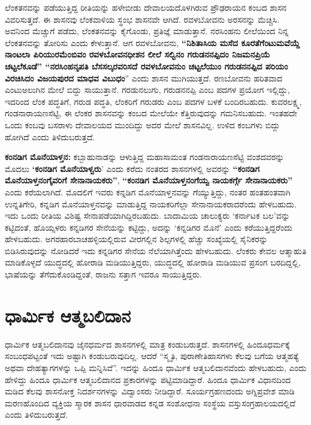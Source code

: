 ಲೆಂಕತನವನ್ನು ಪಡೆಯುತ್ತಿದ್ದ ರೀತಿಯನ್ನು ಹಳೇಬೀಡು ದೇವಾಲಯದೊಳಗಿರುವ ಪ್ರೌಢರಾಯನ ಕಂಬದ ಶಾಸನ ವಿವರಿಸುತ್ತದೆ. ಈ ಶಾಸನವು ಲೆಂಕವಾಳಿಯ ಸ್ಥಂಭ ಶಾಸನವೇ ಆಗಿದೆ. ರವಳಬೋವನು ಅರಸನನ್ನು ಮೆಚ್ಚಿಸಿ. ಅವನಿಂದ ಮೆಚ್ಚುಗೆ ಪಡೆದು, ಲೆಂಕತನವನ್ನು ಕೈಗೊಂಡು, ಪ್ರತಿಜ್ಞೆ ಮಾಡುತ್ತಾನೆ. ನರಸಿಂಹನು ಲೀಲೆಯಿಂದ ನಿನ್ನ ಲೆಂಕತನವನ್ನು ತೋರಿಸು ಎಂದು ಕೇಳುತ್ತಾನೆ. ಆಗ ರವಳಬೋವನು, \textbf{“ನಿಶಿತಾಸಿಯ ಮಸೆದ ಕೂರತೆಗೆಂಟುಮವೆಯ್ದೆ ನಾಂಟಲಾ ಪಿರಿಯುರಮೆಂಬಿವಂ ರವಳಬೋವನಧೀಶನ ಲೀಲೆ ಸಲ್ವಿನಂ ಗರುಡನನಪ್ಪಿದಂ ನಿಜಮನಪ್ರಿಯೆ ಚಟ್ಟಲೆಕೂಡೆ” “ನರಸಿಂಹನೃಪತಿ ಬೆಸಸಲ್ಕರವರಿಸದೆ ರವಳಬೋವನುಂ ಚಟ್ಟಲೆಯುಂ ಗರುಡನನಪ್ಪಿದ ಪರಿಯಂ ವಿರಚಿಸಿದಂ ವಿಜಯಪುರದ ಮಾಧವ ವಿಬುಧಂ}” ಎಂದು ಶಾಸನ ಮುಗಿಯುತ್ತದೆ. ರಣಬೋವನು ಹರಿತವಾದ ಎಂಟುಅಲುಗಿನ ಮೇಲೆ ಬಿದ್ದು ಸಾಯುತ್ತಾನೆ. ಗರಡುನಲುಗು, ಗರುಡನನಪ್ಪಿ ಎಂಬ ಪದಗಳ ಪ್ರಯೋಗ ಇಲ್ಲಿದ್ದು, ಇದರಿಂದ ಲೆಂಕ ಪದ್ಧತಿಗೆ, ಗರುಡ ಪದ್ಧತಿ, ಲೆಂಕರಿಗೆ ಗರುಡರು ಎಂಬ ಪದಗಳ ಬಳಕೆ ಬಂದಿರಬಹುದು. ಕುವರಲಕ್ಷ್ಮ, ಗಂಡನಾರಾಯಣಸೆಟ್ಟಿ, ಈ ಲೆಂಕರ ಶಾಸನವನ್ನು ಕಂಬದ ಮೇಲೆಯೇ ಕೆತ್ತಿರುವುದನ್ನು ಗಮನಿಸಬಹುದು. ಇಂತಹದೇ ಒಂದು ಕಂಬವು ಬಸರಾಳು ದೇವಾಲಯದ ಮುಂದಿದ್ದು ಅದರ ಮೇಲೆ ಶಾಸನವಿಲ್ಲ. ಉಳಿದ ಕಂಬಗಳು ಬಿದ್ದು ಹೋಗಿದೆ ಎಂದು ತಿಳಿದುಬರುತ್ತದೆ.

\textbf{ಕಂನಡಿಗ ಮೊನೆಯಾಳ್ತನ: }ಕಬ್ಬಾಹುನಾಡನ್ನು ಆಳುತ್ತಿದ್ದ ಮಹಾಸಾಮಂತ ಗಂಡನಾರಾಯಣಸೆಟ್ಟಿ ವಂಶದವರನ್ನು ಮೊದಲು \textbf{‘ಕಂನಡಿಗ ಮೊನೆಯಾಳ್ವರು}’ ಎಂದು ಕರೆದು ನಂತರದ ಶಾಸನಗಳಲ್ಲಿ ಅವರನ್ನು \textbf{“ಕಂನಡಿಗ ಮೊನೆಯಾಳ್ತನಂಗೈವರಿಗೆ ಸೇನಾನಾಯಕರು”}, \textbf{“ಕಂನಡಿಗ ಮೊನೆಯಾಳ್ತನಂಗೆಯ್ವ ನಾಯಕರ್ಗ್ಗೆ ಸೇನಾನಾಯಕರು”} ಎಂದು ಕರೆಯಲಾಗಿದೆ. ಮೊದಲಿಗೆ ಇವರು ಕನ್ನಡಿಗ ಮೊನೆಯಾಳ್ತನವನ್ನು ಗೆಯ್ಯುತ್ತಿದ್ದು, ನಂತರ ಹಂತಹಂತವಾಗಿ ಉನ್ನತಿಗೇರಿ, ಕನ್ನಡಿಗ ಮೊನೆಯಾಳ್ತನವನ್ನು ಮಾಡುತ್ತಿದ್ದ ನಾಯಕರಿಗೆಲ್ಲಾ ಸೇನಾನಾಯಕರಾದರೆಂದು ಹೇಳಬಹುದು. ಇದು ಒಂದು ರೀತಿಯ ವಿಶಿಷ್ಟ ಸೇನಾಪಡೆಯಾಗಿದ್ದಿರ\-ಬಹುದು. ಬಾದಾಮಿಯ ಚಾಲುಕ್ಯರು ‘ಕರ್ನಾಟಕ ಬಲ’ವನ್ನು ಕಟ್ಟಿದಂತೆ, ಹೊಯ್ಸಳರು ಕನ್ನಡಿಗರ ಸೇನೆಯನ್ನು ಕಟ್ಟಿದ್ದು, ಅದನ್ನು ‘ಕನ್ನಡಿಗರ ಮೊನೆ’ ಎಂದು ಕರೆಯುತ್ತಿದ್ದರೆಂದು ಹೇಳಬಹುದು. ಅಗರಹಾರಬಾಚಹಳ್ಳಿಯಲ್ಲಿರುವ ವೀರಗಲ್ಲಿನ ಶಿಲ್ಪಗಳಲ್ಲಿ ಹೆಚ್ಚು ಸಂಖ್ಯೆಯಲ್ಲಿ ಸೈನಿಕರನ್ನು ಬಿಡಿಸಿರುವುದನ್ನು ನೋಡಿದರೆ ಇದು ಕನ್ನಡಿಗರ ಸೇನೆಯ ನೆಲೆಯಾಗಿತ್ತೆಂದು ಹೇಳಬಹುದು. ಲೆಂಕರು ಕೇವಲ ಆತ್ಮಾಹುತಿ ಮಾಡಿಕೊಳ್ಳದೆ ಯುದ್ಧದಲ್ಲಿ ಹೋರಾಡಿ ಮಡಿಯುತ್ತಿದ್ದರು, ಯುದ್ಧದಲ್ಲಿ ಹೋರಾಡಿ ಮಡಿಯುವ ಪ್ರಸಂಗ ಬರದಿದ್ದಲ್ಲಿ, ಭಾಷೆಯನ್ನು ತೆಗೆದುಕೊಂಡಿದ್ದಂತೆ, ರಾಜನು ಸತ್ತಾಗ ಇವರೂ ಸಾಯುತ್ತಿದ್ದರು.

\newpage

\section*{ಧಾರ್ಮಿಕ ಆತ್ಮಬಲಿದಾನ}

ಧಾರ್ಮಿಕ ಆತ್ಮಬಲಿದಾನವು ಜೈನಧರ್ಮದ ಶಾಸನಗಳಲ್ಲಿ ಮಾತ್ರ ಕಂಡುಬರುತ್ತದೆ. ಶಾಸನಗಳಲ್ಲಿ ಹಿಂದೂಧರ್ಮಕ್ಕೆ ಸಂಬಂಧಪಟ್ಟಂತೆ ಇದು ಅಷ್ಟಾಗಿ ಕಂಡುಬರುವುದಿಲ್ಲ. ಆದರೆ “ಸ್ಮೃತಿ, ಪುರಾಣೇತಿಹಾಸಗಳು ಕೆಲವು ಬಗೆಯ ಆತ್ಮಹತ್ಯೆ ಅಥವಾ ದೇಹತ್ಯಾಗಗಳನ್ನು ಒಪ್ಪಿ ಮನ್ನಿಸಿವೆ”. ಇದನ್ನು ಹಿಂದೂ ಧಾರ್ಮಿಕ ಆತ್ಮಬಲಿದಾನವೆಂದು ಹೇಳಬಹುದು, ಎಂದು ಹೇಳಿದ್ದು ಹಿಂದೂ ಧಾರ್ಮಿಕ ಆತ್ಮಬಲಿದಾನದ ಪ್ರಕಾರಗಳನ್ನು ಪಟ್ಟಿಮಾಡಿದ್ದಾರೆ. ಹಿಂದೂ ಧಾರ್ಮಿಕ ವಿಧಾನದಿಂದ ಮಡಿದ ಕೆಲವು ಶಾಸನೋಕ್ತ ನಿದರ್ಶನಗಳನ್ನು ವಿದ್ವಾಂಸರು ನೀಡಿದ್ದಾರೆ. ಸೂರ್ಯಗ್ರಹಣದಂದು ಅಗ್ನಿಪ್ರವೇಶ ಮಾಡಿ ಮರಣಹೊಂದಿದ ವ್ಯಕ್ತಿಯ ಸ್ಮಾರಕ ಶಾಸನ ಧಾರವಾಡದ ಕನ್ನಡ ಸಂಶೋಧನಾ ಸಂಸ್ಥೆಯ ವಸ್ತುಸಂಗ್ರಹಾಲಯದಲ್ಲಿದೆ ಎಂದು ತಿಳಿದುಬರುತ್ತದೆ.

